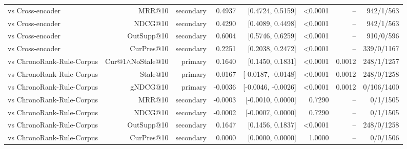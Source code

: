 \begin{table}
{\begin{tabular}{lrrrrrrr}
vs Cross-encoder & MRR@10 & secondary & 0.4937 & [0.4724, 0.5159] & <0.0001 & -- & 942/1/563 \\
vs Cross-encoder & NDCG@10 & secondary & 0.4290 & [0.4089, 0.4498] & <0.0001 & -- & 942/1/563 \\
vs Cross-encoder & OutSupp@10 & secondary & 0.6004 & [0.5746, 0.6259] & <0.0001 & -- & 910/0/596 \\
vs Cross-encoder & CurPres@10 & secondary & 0.2251 & [0.2038, 0.2472] & <0.0001 & -- & 339/0/1167 \\
vs ChronoRank-Rule-Corpus & Cur@1$\wedge$NoStale@10 & primary & 0.1640 & [0.1450, 0.1831] & <0.0001 & 0.0012 & 248/1/1257 \\
vs ChronoRank-Rule-Corpus & Stale@10 & primary & -0.0167 & [-0.0187, -0.0148] & <0.0001 & 0.0012 & 248/0/1258 \\
vs ChronoRank-Rule-Corpus & gNDCG@10 & primary & -0.0036 & [-0.0046, -0.0026] & <0.0001 & 0.0012 & 0/106/1400 \\
vs ChronoRank-Rule-Corpus & MRR@10 & secondary & -0.0003 & [-0.0010, 0.0000] & 0.7290 & -- & 0/1/1505 \\
vs ChronoRank-Rule-Corpus & NDCG@10 & secondary & -0.0002 & [-0.0007, 0.0000] & 0.7290 & -- & 0/1/1505 \\
vs ChronoRank-Rule-Corpus & OutSupp@10 & secondary & 0.1647 & [0.1456, 0.1837] & <0.0001 & -- & 248/0/1258 \\
vs ChronoRank-Rule-Corpus & CurPres@10 & secondary & 0.0000 & [0.0000, 0.0000] & 1.0000 & -- & 0/0/1506 \\
\bottomrule
\end{tabular}}
\end{table}
